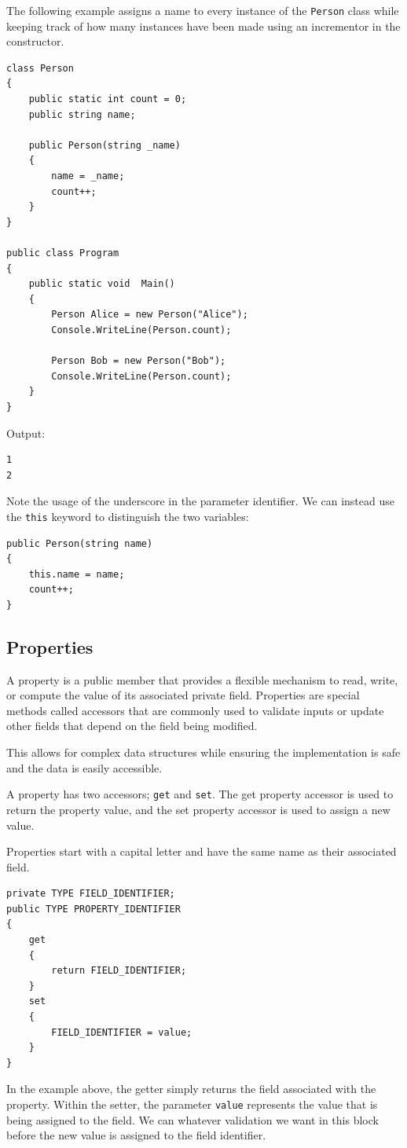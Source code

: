 \documentclass{article}
\begin{document}
The following example assigns a name to every instance of the \lstinline{Person} class while keeping track of 
how many instances have been made using an incrementor in the constructor.
\begin{lstlisting}
class Person
{
    public static int count = 0;
    public string name;

    public Person(string _name)
    {
        name = _name;
        count++;
    }
}

public class Program
{
    public static void  Main()
    {
        Person Alice = new Person("Alice");
        Console.WriteLine(Person.count);

        Person Bob = new Person("Bob");
        Console.WriteLine(Person.count);
    }
}
\end{lstlisting}
Output:
\begin{lstlisting}[numbers=none]
1
2
\end{lstlisting}
Note the usage of the underscore in the parameter identifier. We can instead use
the \lstinline{this} keyword to distinguish the two variables:
\begin{lstlisting}[numbers=none]
public Person(string name)
{
    this.name = name;
    count++;
}
\end{lstlisting}
\subsection{Properties}
A property is a public member that provides a flexible mechanism to read, write, 
or compute the value of its associated private field. Properties are special methods called accessors that are commonly used to validate inputs
or update other fields that depend on the field being modified.

This allows for complex data structures while ensuring the implementation is safe and 
the data is easily accessible. 

A property has two accessors; \lstinline{get} and \lstinline{set}. The get property accessor is used to
return the property value, and the set property accessor is used to assign a new value.

Properties start with a capital letter and have the same name as their associated field.
\begin{lstlisting}[numbers=none]
private TYPE FIELD_IDENTIFIER;
public TYPE PROPERTY_IDENTIFIER 
{
    get
    {
        return FIELD_IDENTIFIER;
    }
    set
    {
        FIELD_IDENTIFIER = value;
    }
}
\end{lstlisting}
In the example above, the getter simply returns the field associated with the property.
Within the setter, the parameter \lstinline{value} represents the value that is being 
assigned to the field. We can whatever validation we want in this block before the new value is assigned to 
the field identifier.
\end{document}
